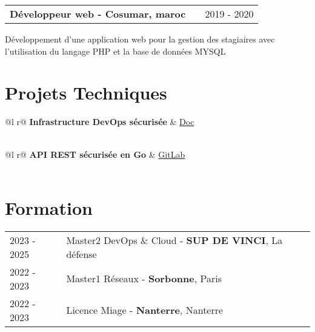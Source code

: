 \documentclass[a4paper,11pt]{article}
\makeatletter
\newenvironment{jobshort}[2]
    {
    \begin{tabularx}{\linewidth}{@{}l X r@{}}
    \textbf{#1} & \hfill &  #2 \\[3.75pt]
    \end{tabularx}
    }
    {
    }
\makeatother
\begin{document}
\begin{jobshort}{Développeur web  - Cosumar, maroc}{2019 - 2020}
\item Développement d'une application web pour la gestion des stagiaires avec l'utilisation du langage PHP et la base de données MYSQL
\end{jobshort}

\section{Projets Techniques}

\begin{tabularx}{\linewidth}{ @{}l r@{} }
\textbf{Infrastructure DevOps sécurisée} & \hfill \href{https://drive.google.com/file/d/1qKTy71e02aBVmqKMihl4VjocVPu23nLi/view?usp=drive_link}{Doc} \\[3.75pt]
  \\
\end{tabularx}

\begin{tabularx}{\linewidth}{ @{}l r@{} }
\textbf{API REST sécurisée en Go} & \hfill \href{https://gitlab.com/spv564816/go-cert-api}{GitLab} \\[3.75pt]
  \\
\end{tabularx}

\section{Formation}
\begin{tabularx}{\linewidth}{@{}l X@{}}	
2023 - 2025 & Master2 DevOps \& Cloud - \textbf{SUP DE VINCI}, La défense \\
2022 - 2023 & Master1 Réseaux - \textbf{Sorbonne}, Paris \\ 
2022 - 2023 & Licence Miage - \textbf{Nanterre}, Nanterre \\ 
\end{tabularx}
\end{document}
